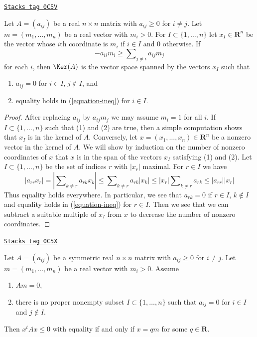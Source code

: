 \begin{lemma}
\label{models-lemma-recurring-real}
\href{https://stacks.math.columbia.edu/tag/0C5V}{\texttt{Stacks tag 0C5V}}

Let $A = (a_{ij})$ be a real $n \times n$ matrix with
$a_{ij} \geq 0$ for $i \not = j$. Let $m = (m_1, \ldots, m_n)$ be a real
vector with $m_i > 0$. For $I \subset \{1, \ldots, n\}$ let
$x_I \in \mathbf{R}^n$
be the vector whose $i$th coordinate is $m_i$ if $i \in I$
and $0$ otherwise. If
\begin{equation}
\label{equation-ineq}
-a_{ii}m_i \geq \sum\nolimits_{j \not = i} a_{ij}m_j
\end{equation}
for each $i$, then $\Ker(A)$ is the vector space
spanned by the vectors $x_I$ such that
\begin{enumerate}
\item $a_{ij} = 0$ for $i \in I$, $j \not \in I$, and
\item equality holds in (\ref{equation-ineq}) for $i \in I$.
\end{enumerate}
\end{lemma}

\begin{proof}
After replacing $a_{ij}$ by $a_{ij}m_j$ we may assume $m_i = 1$ for all $i$.
If $I \subset \{1, \ldots, n\}$ such that (1) and (2) are true,
then a simple computation shows that $x_I$ is in the kernel of $A$.
Conversely, let $x = (x_1, \ldots, x_n) \in \mathbf{R}^n$ be a
nonzero vector in the kernel of $A$. We will show by induction
on the number of nonzero coordinates of $x$ that $x$ is in the
span of the vectors $x_I$ satisfying (1) and (2). Let
$I \subset \{1, \ldots, n\}$ be the set of indices $r$ with $|x_r|$ maximal.
For $r \in I$ we have
$$
|a_{rr} x_r| = |\sum\nolimits_{k \not = r} a_{rk}x_k| \leq
\sum\nolimits_{k \not = r} a_{rk}|x_k| \leq
|x_r| \sum\nolimits_{k \not = r} a_{rk} \leq |a_{rr}||x_r|
$$
Thus equality holds everywhere. In particular, we see that
$a_{rk} = 0$ if $r \in I$, $k \not \in I$ and equality holds
in (\ref{equation-ineq}) for $r \in I$. Then we see that we
can subtract a suitable multiple of $x_I$ from $x$ to decrease
the number of nonzero coordinates.
\end{proof}

\begin{lemma}
\label{models-lemma-recurring-symmetric-real}
\href{https://stacks.math.columbia.edu/tag/0C5X}{\texttt{Stacks tag 0C5X}}

Let $A = (a_{ij})$ be a symmetric real $n \times n$ matrix with
$a_{ij} \geq 0$ for $i \not = j$.
Let $m = (m_1, \ldots, m_n)$ be a real vector with $m_i > 0$.
Assume
\begin{enumerate}
\item $Am = 0$,
\item there is no proper nonempty subset $I \subset \{1, \ldots, n\}$
such that $a_{ij} = 0$ for $i \in I$ and $j \not \in I$.
\end{enumerate}
Then $x^t A x \leq 0$ with equality if and only if $x = qm$
for some $q \in \mathbf{R}$.
\end{lemma}

